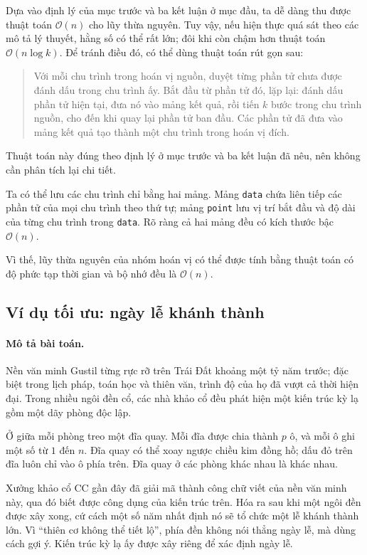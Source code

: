 \documentclass[11pt]{article}
\newcommand{\Oh}{\mathcal{O}}
\begin{document}
Dựa vào định lý của mục trước và ba kết luận ở mục đầu, ta dễ dàng thu được
thuật toán \(\Oh(n)\) cho lũy thừa nguyên. Tuy vậy, nếu hiện thực quá sát theo
các mô tả lý thuyết, hằng số có thể rất lớn; đôi khi còn chậm hơn thuật toán
\(\Oh(n\log k)\). Để tránh điều đó, có thể dùng thuật toán rút gọn sau:

\begin{quote}
Với mỗi chu trình trong hoán vị nguồn, duyệt từng phần tử chưa được đánh dấu
trong chu trình ấy. Bắt đầu từ phần tử đó, lặp lại: đánh dấu phần tử hiện tại,
đưa nó vào mảng kết quả, rồi tiến \(k\) bước trong chu trình nguồn, cho đến khi
quay lại phần tử ban đầu. Các phần tử đã đưa vào mảng kết quả tạo thành một
chu trình trong hoán vị đích.
\end{quote}

Thuật toán này đúng theo định lý ở mục trước và ba kết luận đã nêu, nên không
cần phân tích lại chi tiết.

Ta có thể lưu các chu trình chỉ bằng hai mảng. Mảng \texttt{data} chứa liên
tiếp các phần tử của mọi chu trình theo thứ tự; mảng \texttt{point} lưu vị trí
bắt đầu và độ dài của từng chu trình trong \texttt{data}. Rõ ràng cả hai mảng
đều có kích thước bậc \(\Oh(n)\).

Vì thế, lũy thừa nguyên của nhóm hoán vị có thể được tính bằng thuật toán có
độ phức tạp thời gian và bộ nhớ đều là \(\Oh(n)\).

\subsection{Ví dụ tối ưu: ngày lễ khánh thành}

\paragraph{Mô tả bài toán.}
Nền văn minh Gustil từng rực rỡ trên Trái Đất khoảng một tỷ năm trước; đặc
biệt trong lịch pháp, toán học và thiên văn, trình độ của họ đã vượt cả thời
hiện đại. Trong nhiều ngôi đền cổ, các nhà khảo cổ đều phát hiện một kiến trúc
kỳ lạ gồm một dãy phòng độc lập.

Ở giữa mỗi phòng treo một đĩa quay. Mỗi đĩa được chia thành \(p\) ô, và mỗi ô
ghi một số từ \(1\) đến \(n\). Đĩa quay có thể xoay ngược chiều kim đồng hồ;
dấu đỏ trên đĩa luôn chỉ vào ô phía trên. Đĩa quay ở các phòng khác nhau là
khác nhau.

Xưởng khảo cổ CC gần đây đã giải mã thành công chữ viết của nền văn minh này,
qua đó biết được công dụng của kiến trúc trên. Hóa ra sau khi một ngôi đền
được xây xong, cứ cách một số năm nhất định nó sẽ tổ chức một lễ khánh thành
lớn. Vì ``thiên cơ không thể tiết lộ'', phía đền không nói thẳng ngày lễ, mà
dùng cách gợi ý. Kiến trúc kỳ lạ ấy được xây riêng để xác định ngày lễ.
\end{document}
